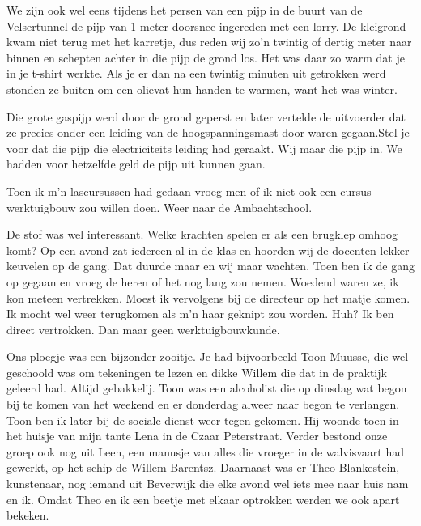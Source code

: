 \documentclass[10pt,twoside, openright]{memoir}
\begin{document}
We zijn ook wel eens tijdens het persen van een pijp in de buurt van de Velsertunnel de pijp van 1 meter doorsnee ingereden met een lorry. De kleigrond kwam niet terug met het karretje, dus reden wij zo'n twintig of dertig meter naar binnen en schepten achter in die pijp de grond los. Het was daar zo warm dat je in je t-shirt werkte. Als je er dan na een twintig minuten uit getrokken werd stonden ze buiten om een olievat hun handen te warmen, want het was winter. 

Die grote gaspijp werd door de grond geperst en later vertelde de uitvoerder dat ze precies onder een leiding van de hoogspanningsmast door waren gegaan.Stel je voor dat die pijp die electriciteits leiding had geraakt. Wij maar die pijp in. We hadden voor hetzelfde geld de pijp uit kunnen gaan.

Toen ik m’n lascursussen had gedaan vroeg men of ik niet ook een cursus werktuigbouw zou willen doen. Weer naar de Ambachtschool. 

De stof was wel interessant. Welke krachten spelen er als een brugklep omhoog komt? Op een avond zat iedereen al in de klas en hoorden wij de docenten lekker keuvelen op de gang. Dat duurde maar en wij maar wachten. Toen ben ik de gang op gegaan en vroeg de heren of het nog lang zou nemen. Woedend waren ze, ik kon meteen vertrekken. Moest ik vervolgens bij de directeur op het matje komen. Ik mocht wel weer terugkomen als m’n haar geknipt zou worden. Huh? Ik ben direct vertrokken. Dan maar geen werktuigbouwkunde.

Ons ploegje was een bijzonder zooitje. Je had bijvoorbeeld Toon Muusse, die wel geschoold was om tekeningen te lezen en dikke Willem die dat in de praktijk geleerd had. Altijd gebakkelij. Toon was een alcoholist die op dinsdag wat begon bij te komen van het weekend en er donderdag alweer naar begon te verlangen. Toon ben ik later bij de sociale dienst weer tegen gekomen. Hij woonde toen in het huisje van mijn tante Lena in de Czaar Peterstraat. Verder bestond onze groep ook nog uit Leen, een manusje van alles die vroeger in de walvisvaart had gewerkt, op het schip de Willem Barentsz. Daarnaast was er Theo Blankestein, kunstenaar, nog iemand uit Beverwijk die elke avond wel iets mee naar huis nam en ik. Omdat Theo en ik een beetje met elkaar optrokken werden we ook apart bekeken. 
\end{document}
